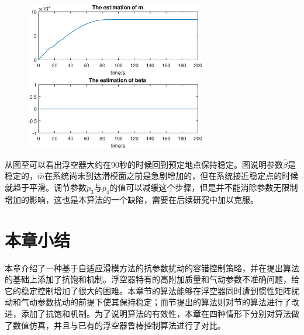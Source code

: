\begin{figure}[!htp]
    \centering
    \includegraphics[width=0.7\textwidth,clip]{figure/chap03/case3-paraest.eps}
\end{figure}

从图至可以看出浮空器大约在90秒的时候回到预定地点保持稳定。图说明参数$\hat{\beta}$是稳定的，$\hat{m}$在系统尚未到达滑模面之前是急剧增加的，但在系统接近稳定点的时候就趋于平滑。调节参数$p_3$与$p_4$的值可以减缓这个步骤，但是并不能消除参数无限制增加的影响，这也是本算法的一个缺陷，需要在后续研究中加以克服。


\section{本章小结}
本章介绍了一种基于自适应滑模方法的抗参数扰动的容错控制策略，并在提出算法的基础上添加了抗饱和机制。浮空器特有的高附加质量和气动参数不准确问题，给它的稳定控制增加了很大的困难。本章节的算法能够在浮空器同时遭到惯性矩阵扰动和气动参数扰动的前提下使其保持稳定；而节提出的算法则对节的算法进行了改进，添加了抗饱和机制。为了说明算法的有效性，本章在四种情形下分别对算法做了数值仿真，并且与已有的浮空器鲁棒控制算法进行了对比。